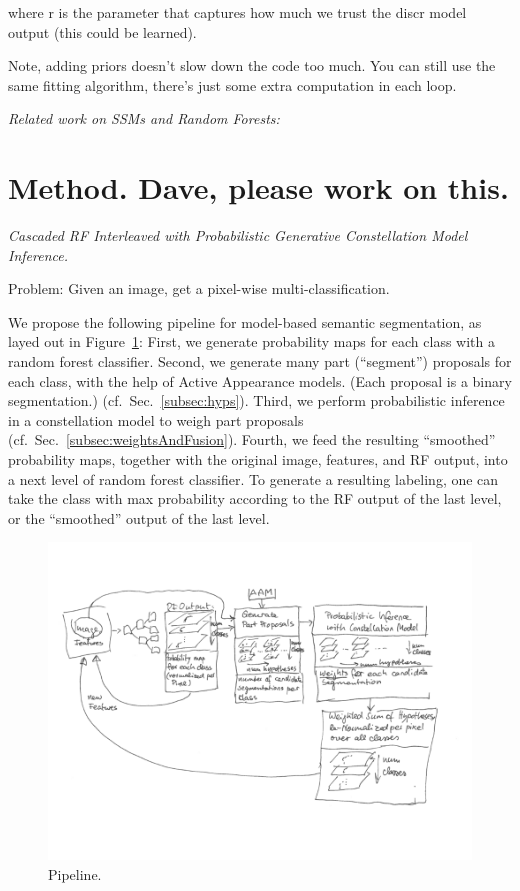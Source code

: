 \documentclass[10pt,twocolumn,letterpaper]{article}
\begin{document}
where r is the parameter that captures how much we trust the discr model output (this could be learned). 

Note, adding priors doesn't slow down the code too much.  You can still use the same fitting algorithm, there's just some extra computation in each loop.

\emph{Related work on SSMs and Random Forests: }



\section{Method. Dave, please work on this.}
\emph{Cascaded RF Interleaved with Probabilistic Generative Constellation Model Inference.}

Problem: Given an image, get a pixel-wise multi-classification. 

We propose the following pipeline for model-based semantic segmentation, as layed out in Figure~\ref{fig:pipeline}: 
%
First, we generate probability maps for each class with a random forest classifier.
%
Second, we generate many part ("`segment"') proposals for each class, with the help of Active Appearance models. 
(Each proposal is a binary segmentation.) (cf.\ Sec.\ \ref{subsec:hyps}). 
%
Third, we perform probabilistic inference in a constellation model to weigh part proposals (cf.\ Sec.\ \ref{subsec:weightsAndFusion}). 
%
Fourth, we feed the resulting "`smoothed"' probability maps, together with the original image, features, and RF output, into a next level of random forest classifier. 
%
To generate a resulting labeling, one can take the class with max probability according to the RF output of the last level, or the "`smoothed"' output of the last level. 


\begin{figure}[t]
\begin{center}
\includegraphics[width=\textwidth]{Pipeline.png} %
\caption{Pipeline.}
\label{fig:pipeline}
\end{center}
\end{figure}
\end{document}
